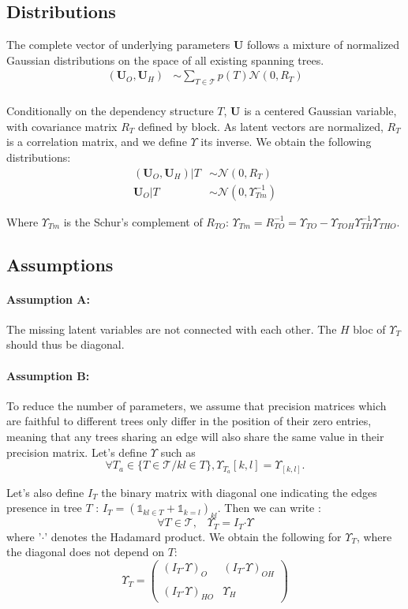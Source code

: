 \documentclass[11pt,a4paper]{article}
\newcommand{\Ubf}{\boldsymbol{U}}
\newcommand{\had}{\boldsymbol{\cdot}}
\begin{document}
\subsection{Distributions}
\label{distrib}
 
The complete vector of underlying parameters $\Ubf$ follows a mixture of normalized Gaussian distributions on the space of all existing spanning trees.
\begin{align*}
(\Ubf_O,\Ubf_H) &\sim \sum_{T \in \mathcal{T}} p(T) \mathcal{N}(0,R_T) \\
\end{align*}

 
Conditionally on the dependency structure $T$, $\Ubf$ is a centered Gaussian variable, with covariance matrix $R_T$ defined by block. As latent vectors are normalized, $R_T$ is a correlation matrix, and we define $\Upsilon$ its inverse. We obtain the following distributions:
\begin{align*}
(\Ubf_O,\Ubf_H)|T & \sim\mathcal{N}(0,R_T)\\
\Ubf_O|T & \sim\mathcal{N}(0,\Upsilon_{Tm}^{-1})
\end{align*}
 

Where  $ \Upsilon_{Tm} $ is the Schur's complement of $R_{TO}$: $\Upsilon_{Tm}=R_{TO}^{-1} =  \Upsilon_{TO} - \Upsilon_{TOH}\Upsilon_{TH}^{-1}\Upsilon_{THO}$. 

\subsection{Assumptions}
\paragraph{Assumption A:} The missing latent variables are not connected with each other. The $H$ bloc of $\Upsilon_T$ should thus be diagonal.

\paragraph{Assumption B:} To reduce the number of parameters, we assume that precision matrices which are faithful to different trees  only differ in the position of their zero entries, meaning that any trees sharing  an edge will also share the same value in their precision matrix. Let's define $\Upsilon$ such as $$\forall T_a \in \{T \in\mathcal{T} / kl \in T \}, \Upsilon_{T_a}[k,l] =  \Upsilon_ [k,l].$$

 Let's also define $I_T$ the binary matrix with diagonal one indicating the  edges presence in tree $T$ : $I_T=(\mathds{1}_{kl \in T} + \mathds{1}_{k=l})_{kl}$. Then we can write :
$$\forall T\in \mathcal{T}, \;\;\; \Upsilon_T = I_T \had \Upsilon $$
where '$\had$' denotes the Hadamard product. We obtain the following for $\Upsilon_T$, where the diagonal does not depend on $T$:
\[
 \Upsilon_T=
  \left( {\begin{array}{cc}
 (I_T \had \Upsilon)_O &  (I_T \had \Upsilon)_{OH}\\\\
 (I_T \had \Upsilon)_{HO} &   \Upsilon_H 
  \end{array} } \right) \]\\
 
\end{document}
